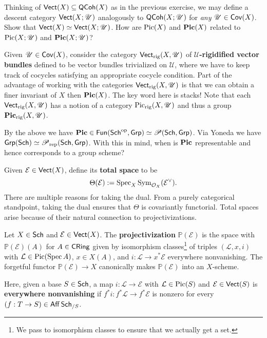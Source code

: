 \documentclass[11pt]{article}
\newcommand{\EE}{\mathcal{E}}
\renewcommand{\L}{\mathcal{L}}
\renewcommand{\P}{\mathbb{P}}
\newcommand{\U}{\mathscr{U}}
\DeclareMathOperator{\rig}{rig} %
\begin{document}
\begin{exercise}
Thinking of $\operatorname{\mathsf{Vect}}(X)\subseteq\operatorname{\mathsf{QCoh}}(X)$ as in the previous exercise, we may define a descent category $\Vect(X;\U)$ analogously to $\QCoh(X;\U)$ for \emph{any} $\U\in\Cov(X)$. Show that $\Vect(X)\simeq\Vect(X;\U)$. How are $\operatorname{Pic}(X)$ and $\operatorname{\mathbf{Pic}}(X)$ related to $\Pic(X;\U)$ and $\PPic(X;\U)$?
\end{exercise}

\begin{exercise}
Given $\U\in\Cov(X)$, consider the category $\Vect_{\rig}(X,\U)$ of \textbf{$\U$-rigidified vector bundles} defined to be vector bundles trivialized on $\U$, where we have to keep track of cocycles satisfying an appropriate cocycle condition. Part of the advantage of working with the categories $\Vect_{\rig}(X,\U)$ is that we can obtain a finer invariant of $X$ then $\operatorname{\mathbf{Pic}}(X)$. The key word here is stacks! Note that each $\Vect_{\rig}(X,\U)$ has a notion of a category $\Pic_{\rig}(X,\U)$ and thus a group $\PPic_{\rig}(X,\U)$.
\end{exercise}

\begin{exercise}
By the above we have $\operatorname{\mathbf{Pic}}\in\operatorname{\mathsf{Fun}}(\operatorname{\mathsf{Sch}}^{\operatorname{op}},\operatorname{\mathsf{Grp}})\simeq\operatorname{\mathscr{P}}(\operatorname{\mathsf{Sch}},\operatorname{\mathsf{Grp}})$. Via Yoneda we have $\operatorname{\mathsf{Grp}}(\operatorname{\mathsf{Sch}})\simeq\operatorname{\mathscr{P}}_{\operatorname{rep}}(\operatorname{\mathsf{Sch}},\operatorname{\mathsf{Grp}})$. With this in mind, when is $\operatorname{\mathbf{Pic}}$ representable and hence corresponds to a group scheme?
\end{exercise}

Given $\EE\in\Vect(X)$, define its \textbf{total space} to be
$$\Theta(\EE):=\Spec_X\Sym_{\O_X}(\EE^{\vee}).$$
There are multiple reasons for taking the dual. From a purely categorical standpoint, taking the dual ensures that $\Theta$ is covariantly functorial. Total spaces arise because of their natural connection to projectivizations.

\begin{definition}
Let $X\in\operatorname{\mathsf{Sch}}$ and $\EE\in\Vect(X)$. The \textbf{projectivization} $\P(\EE)$ is the space with $\P(\EE)(A)$ for $A\in\operatorname{\mathsf{CRing}}$ given by isomorphism classes\footnote{We pass to isomorphism classes to ensure that we actually get a set.} of triples $(\L,x,i)$ with $\L\in\Pic(\Spec A)$, $x\in X(A)$, and $i: \L\to x^*\EE$ everywhere nonvanishing. The forgetful functor $\P(\EE)\to X$ canonically makes $\P(\EE)$ into an $X$-scheme.
\end{definition}

Here, given a base $S\in\operatorname{\mathsf{Sch}}$, a map $i: \L\to\EE$ with $\L\in\Pic(S)$ and $\EE\in\Vect(S)$ is \textbf{everywhere nonvanishing} if $f^*i: f^*\L\to f^*\EE$ is nonzero for every $(f: T\to S)\in\operatorname{\mathsf{Aff}}\operatorname{\mathsf{Sch}}_{/S}$.
\end{document}
